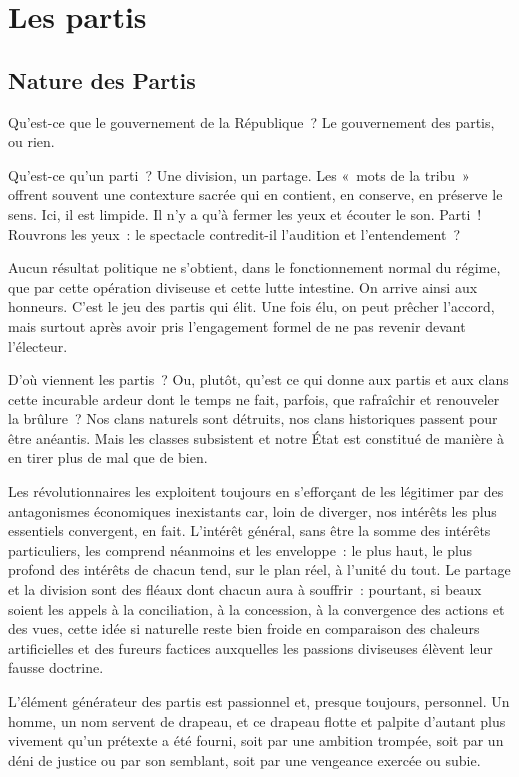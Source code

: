\documentclass[french,twoside]{book} %
\newcommand{\astermono}{\medskip\centerline{\color{rubric}\large\selectfont{\syms ✻}}\medskip\par}%
\begin{document}
\section[{Les partis}]{Les partis}
\subsection[{Nature des Partis}]{Nature des Partis}
\noindent Qu’est-ce que le gouvernement de la République ? Le gouvernement des partis, ou rien.\par
Qu’est-ce qu’un parti ? Une division, un partage. Les « mots de la tribu » offrent souvent une contexture sacrée qui en contient, en conserve, en préserve le sens. Ici, il est limpide. Il n’y a qu’à fermer les yeux et écouter le son. Parti ! Rouvrons les yeux : le spectacle contredit-il l’audition et l’entendement ?\par
Aucun résultat politique ne s’obtient, dans le fonctionnement normal du régime, que par cette opération diviseuse et cette lutte intestine. On arrive ainsi aux honneurs. C’est le jeu des partis qui élit. Une fois élu, on peut prêcher l’accord, mais surtout après avoir pris l’engagement formel de ne pas revenir devant l’électeur.\par

\astermono

\noindent D’où viennent les partis ? Ou, plutôt, qu’est ce qui donne aux partis et aux clans cette incurable ardeur dont le temps ne fait, parfois, que rafraîchir et renouveler la brûlure ? Nos clans naturels sont détruits, nos clans historiques passent pour être anéantis. Mais les classes subsistent et notre État est constitué de manière à en tirer plus de mal que de bien.\par
Les révolutionnaires les exploitent toujours en s’efforçant de les légitimer par des antagonismes économiques inexistants car, loin de diverger, nos intérêts les plus essentiels convergent, en fait. L’intérêt général, sans être la somme des intérêts particuliers, les comprend néanmoins et les enveloppe : le plus haut, le plus profond des intérêts de chacun tend, sur le plan réel, à l’unité du tout. Le partage et la division sont des fléaux dont chacun aura à souffrir : pourtant, si beaux soient les appels à la conciliation, à la concession, à la convergence des actions et des vues, cette idée si naturelle reste bien froide en comparaison des chaleurs artificielles et des fureurs factices auxquelles les passions diviseuses élèvent leur fausse doctrine.\par
L’élément générateur des partis est passionnel et, presque toujours, personnel. Un homme, un nom servent de drapeau, et ce drapeau flotte et palpite d’autant plus vivement qu’un prétexte a été fourni, soit par une ambition trompée, soit par un déni de justice ou par son semblant, soit par une vengeance exercée ou subie.\par
\end{document}
